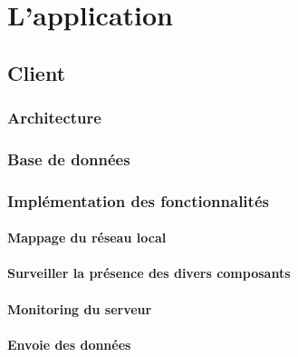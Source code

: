 






\chapter{L'application}
\label{sec:archi}


\section{Client}

\subsection{Architecture}
\label{sec:c_arch}
\subsection{Base de données}

\subsection{Implémentation des fonctionnalités}

\subsubsection{Mappage du réseau local}


\subsubsection{Surveiller la présence des divers composants}

\subsubsection{Monitoring du serveur}

\subsubsection{Envoie des données}



